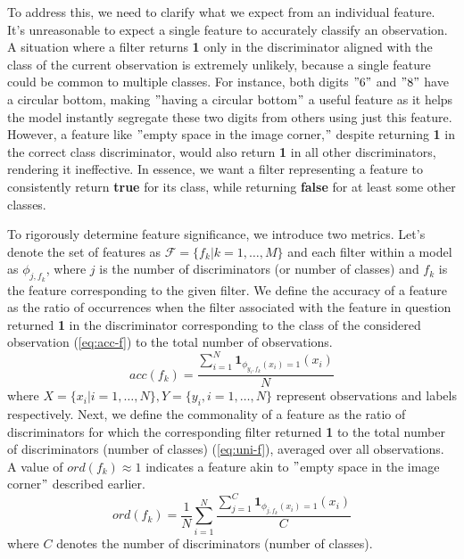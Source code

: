 \documentclass{article}[12pt]
\begin{document}
To address this, we need to clarify what we expect from an individual feature.
It's unreasonable to expect a single feature to accurately classify an observation.
A situation where a filter returns \textbf{1} only in the discriminator aligned with the class of the current observation is extremely unlikely, because a single feature could be common to multiple classes.
For instance, both digits \("6"\) and \("8"\) have a circular bottom, making \("\)having a circular bottom\("\) a useful feature as it helps the model instantly segregate these two digits from others using just this feature.
However, a feature like \("\)empty space in the image corner,\("\) despite returning \textbf{1} in the correct class discriminator, would also return \textbf{1} in all other discriminators, rendering it ineffective.
In essence, we want a filter representing a feature to consistently return \textbf{true} for its class, while returning \textbf{false} for at least some other classes.

To rigorously determine feature significance, we introduce two metrics.
Let's denote the set of features as $\mathcal{F} = \{f_k|k=1,\dots,M\}$ and each filter within a model as $\phi_{j,f_k}$, where $j$ is the number of discriminators (or number of classes) and $f_k$ is the feature corresponding to the given filter.
We define the accuracy of a feature as the ratio of occurrences when the filter associated with the feature in question returned \textbf{1} in the discriminator corresponding to the class of the considered observation (\ref{eq:acc-f}) to the total number of observations.
\begin{equation}\label{eq:acc-f}
    acc(f_k) = \frac{\sum_{i=1}^{N}\mathbf{1}_{\phi_{y_i,f_k}(x_i) = 1}(x_i)}{N}
\end{equation}
where $X = \{x_i|i=1,\dots,N\}, Y = \{y_i,i=1,\dots,N\}$ represent observations and labels respectively.
Next, we define the commonality of a feature as the ratio of discriminators for which the corresponding filter returned \textbf{1} to the total number of discriminators (number of classes) (\ref{eq:uni-f}), averaged over all observations.
A value of $ord(f_k) \approx 1$ indicates a feature akin to \("\)empty space in the image corner\("\) described earlier.
\begin{equation}\label{eq:uni-f}
    ord(f_k) = \frac{1}{N}\sum_{i=1}^{N}\frac{\sum_{j=1}^{C}\mathbf{1}_{\phi_{j,f_k}(x_i) = 1}(x_i)}{C}
\end{equation}
where $C$ denotes the number of discriminators (number of classes).
\end{document}
